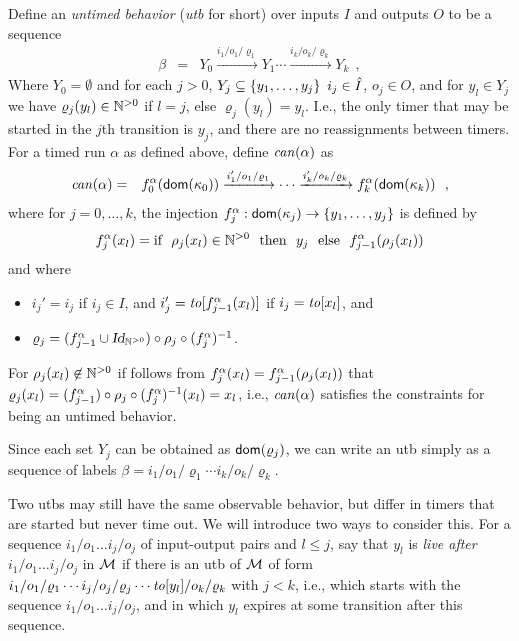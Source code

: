 Define an \emph{untimed behavior} (\emph{utb} for short)
over inputs $I$ and outputs $O$ to be a sequence 
\begin{eqnarray*}
  \beta & = & Y_0 \xrightarrow{i_1/o_1/\varrho_1} Y_1  \cdots \xrightarrow{i_k/o_k/\varrho_k} Y_{k}
  \ \ ,
\end{eqnarray*}
Where $Y_0 = \emptyset$ and for each $j>0$, $Y_j \subseteq \lbrace y_1, \ldots , y_j\rbrace$  $i_j \in \hat{I}$, $o_j \in O$,
and for $y_l \in Y_j$ we have $\varrho_j(y_l) \in {\mathbb N}^{>0}$ if $l=j$, else $\varrho_j(y_l) = y_l$.
I.e., the only timer that may be started in the $j$th transition is $y_j$, and there are no
reassignments between timers.
For a timed run $\alpha$ as defined above,  define
$\mathit{can}({\alpha})$ as
\begin{eqnarray*}
  \mathit{can}({\alpha}) & = & f_{0}^{\alpha}({\textsf{dom}}(\kappa_0)) \xrightarrow{i_1'/o_1/\varrho_1}
\cdots \xrightarrow{i_k'/o_k/\varrho_k} f_{k}^{\alpha}({\textsf{dom}}(\kappa_k))
  \ \ ,
\end{eqnarray*}
where for $j = 0, \ldots , k$, the injection
$f_{j}^{\alpha}: {\textsf{dom}}(\kappa_j) \rightarrow \lbrace y_1, \ldots ,y_j\rbrace$
is defined by
\[
f_{j}^{\alpha}(x_l) = \mbox{if} \ \ \rho_j(x_l) \in {\mathbb N}^{>0}
\ \ \mbox{then} \ \ y_j
\ \ \mbox{else} \ \
f_{j-1}^{\alpha}(\rho_j(x_l))
\]
and where
\begin{itemize}
\item
  $i_j'   =   i_j$ if $i_j \in I$, and
$i_j'   = \mathit{to}[f_{j-1}^{\alpha}(x_l)]$ if $i_j   = \mathit{to}[x_l]$, and
\item
  $\varrho_j = (f_{j-1}^{\alpha} \cup \mbox{\sl Id}_{{\mathbb N}^{>0}}) \circ \rho_j \circ (f_{j}^{\alpha})^{-1}$.
\end{itemize}
For $\rho_j(x_l) \not\in {\mathbb N}^{>0}$ if follows from
$f_{j}^{\alpha}(x_l) = f_{j-1}^{\alpha}(\rho_j(x_l))$ that
$\varrho_j(x_l) = (f_{j-1}^{\alpha}) \circ \rho_j \circ (f_{j}^{\alpha})^{-1}(x_l) = x_l$, i.e.,
$\mathit{can}({\alpha})$ satisfies the constraints for being an untimed behavior.


Since each set $Y_j$ can be obtained as ${\textsf{dom}}(\varrho_j)$, we can write
an utb simply as a sequence of labels
$\beta  =  {i_1/o_1/\varrho_1}  \cdots {i_k/o_k/\varrho_k}$.

Two utbs may still have the same observable behavior, but
differ in timers that are started but never time out. We will introduce two
ways to consider this.
For a sequence $i_1/o_1 \ldots i_j/o_j$ of input-output pairs and
$l \leq j$, say that $y_l$ is \emph{live after $i_1/o_1 \ldots i_j/o_j$} in ${\mathcal M}$
if there is an utb of ${\mathcal M}$ of form
${i_1/o_1/\varrho_1}  \cdots {i_j/o_j/\varrho_j} \cdots {\mathit{to}[y_l]/o_k/\varrho_k}$
with $j < k$,  i.e., which starts with the sequence
$i_1/o_1 \ldots i_j/o_j$, and in which $y_l$ expires at some transition after
this sequence.

